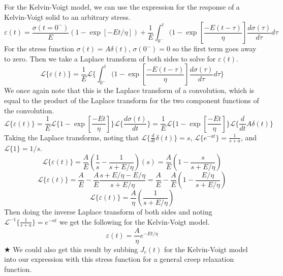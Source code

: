 \documentclass[preprint,12pt,authoryear]{elsarticle}
\begin{document}
For the Kelvin-Voigt model, we can use the expression for the response of a Kelvin-Voigt solid to an arbitrary stress.
\begin{equation}
    \varepsilon(t) = \frac{\sigma(t = 0^-)}{E}(1-\exp[-Et/\eta]) + \frac{1}{E} \int_{0^-}^{t}(1 - \exp[\frac{-E(t-\tau)}{\eta}]\frac{d\sigma(\tau)}{d\tau}d\tau
\end{equation}
For the stress function $\sigma(t) = A \delta(t)$, $\sigma(0^-) = 0$ so the first term goes away to zero. Then we take a Laplace transform of both sides to solve for $\varepsilon(t)$.
\begin{equation}
    \mathcal{L}\{ \varepsilon(t)\} = \frac{1}{E}\mathcal{L}\{  \int_{0^-}^{t}(1 - \exp[\frac{-E(t-\tau)}{\eta}]\frac{d\sigma(\tau)}{d\tau}d\tau \}
\end{equation}
We once again note that this is the Laplace transform of a convolution, which is equal to the product of the Laplace transform for the two component functions of the convolution.
\begin{equation}
    \mathcal{L}\{ \varepsilon(t)\} = \frac{1}{E}\mathcal{L}\{1 - \exp[\frac{-Et}{\eta}]\} \mathcal{L}\{\frac{d\sigma(t)}{dt}\} = \frac{1}{E}\mathcal{L}\{1 - \exp[\frac{-Et}{\eta}]\} \mathcal{L}\{\frac{d}{dt} A\delta(t)\}
\end{equation}
Taking the Laplace transforms, noting that $\mathcal{L}\{\frac{d}{dt}\delta(t) \} =  s$, $\mathcal{L}\{e^{-at} \} = \frac{1}{s+a}$, and $\mathcal{L}\{1\} =1/s$.
\begin{equation}
    \mathcal{L}\{ \varepsilon(t)\} = \frac{A}{E}(\frac{1}{s}-\frac{1}{s+E/\eta})(s) = \frac{A}{E}(1 - \frac{s}{s+E/\eta})
\end{equation}
\begin{equation}
    \mathcal{L}\{ \varepsilon(t)\} = \frac{A}{E}- \frac{A}{E}\frac{s + E/\eta - E/\eta}{s+E/\eta} = \frac{A}{E}- \frac{A}{E}(1-\frac{E/\eta}{s+E/\eta})
\end{equation}
\begin{equation}
    \mathcal{L}\{ \varepsilon(t)\} = \frac{A}{\eta}(\frac{1}{s+E/\eta})
\end{equation}
Then doing the inverse Laplace transform of both sides and noting $\mathcal{L}^{-1}\{\frac{1}{s + a}\} = e^{-at}$ we get the following for the Kelvin-Voigt model.
\begin{equation}
    \varepsilon(t) = \frac{A}{\eta}e^{-Et/\eta}
\end{equation}
\hspace*{\fill} $\bigstar$
\medskip \newline
We could also get this result by subbing $J_c(t)$ for the Kelvin-Voigt model into our expression with this stress function for a general creep relaxation function.
\end{document}
